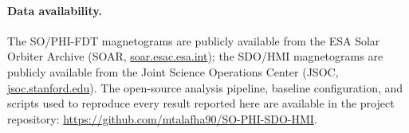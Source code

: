 \documentclass{aa}
\begin{document}
\paragraph{Data availability.}
The SO/PHI-FDT magnetograms are publicly available from the ESA Solar Orbiter Archive (SOAR, \url{soar.esac.esa.int}); the SDO/HMI magnetograms are publicly available from the Joint Science Operations Center (JSOC, \url{jsoc.stanford.edu}). The open-source analysis pipeline, baseline configuration, and scripts used to reproduce every result reported here are available in the project repository: \url{https://github.com/mtalafha90/SO-PHI-SDO-HMI}.



\end{document}

